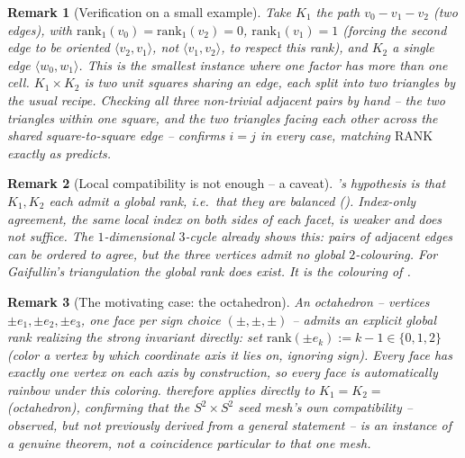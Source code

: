 \documentclass[11pt]{article}
\newtheorem*{remthm}{Remark}
\begin{document}
\begin{remthm}[Verification on a small example]
Take $K_1$ the path $v_0\!-\!v_1\!-\!v_2$ (two edges), with
$\mathrm{rank}_1(v_0)=\mathrm{rank}_1(v_2)=0$, $\mathrm{rank}_1(v_1)=1$
(forcing the second edge to be oriented $\langle v_2,v_1\rangle$, not
$\langle v_1,v_2\rangle$, to respect this rank), and $K_2$ a single edge
$\langle w_0,w_1\rangle$. This is the smallest instance where one factor
has more than one cell. $K_1\times K_2$ is two unit squares sharing an
edge, each split into two triangles by the usual recipe. Checking all
three non-trivial adjacent pairs by hand -- the two triangles \emph{within}
one square, and the two triangles facing each other \emph{across} the
shared square-to-square edge -- confirms $i=j$ in every case, matching
$\mathrm{RANK}$ exactly as  predicts.
\end{remthm}

\begin{remthm}[Local compatibility is not enough -- a caveat]
\label{rem:localglobal}
's hypothesis is that $K_1,K_2$ each admit a
\emph{global} rank, i.e.\ that they are balanced ().
Index-only agreement, the same local \emph{index} on both sides of each
facet, is weaker and does not suffice. The $1$-dimensional $3$-cycle
already shows this: pairs of adjacent edges can be ordered to agree, but
the three vertices admit no global $2$-colouring. For Gaifullin's
triangulation the global rank does exist. It is the colouring of
.
\end{remthm}

\begin{remthm}[The motivating case: the octahedron]
An octahedron -- vertices $\pm e_1,\pm e_2,\pm e_3$, one face per sign
choice $(\pm,\pm,\pm)$ -- admits an explicit global rank realizing the
strong invariant directly: set $\mathrm{rank}(\pm e_k):=k-1\in\{0,1,2\}$
(color a vertex by \emph{which coordinate axis} it lies on, ignoring
sign). Every face has exactly one vertex on each axis by construction, so
every face is automatically rainbow under this coloring. 
therefore applies directly to $K_1=K_2=$ (octahedron), confirming that the
$S^2\times S^2$ seed mesh's own compatibility -- observed, but not
previously derived from a general statement -- is an instance of a
genuine theorem, not a coincidence particular to that one mesh.
\end{remthm}

\end{document}
